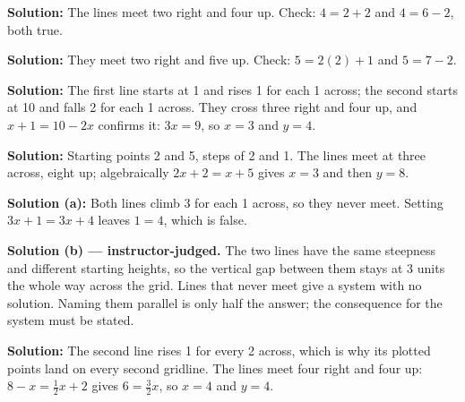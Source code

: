 \documentclass[12pt]{article}
\begin{document}




\textbf{Solution:} The lines meet two right and four up. Check: $4 = 2 + 2$
and $4 = 6 - 2$, both true. 


\textbf{Solution:} They meet two right and five up. Check: $5 = 2(2) + 1$ and
$5 = 7 - 2$. 


\textbf{Solution:} The first line starts at 1 and rises 1 for each 1 across;
the second starts at 10 and falls 2 for each 1 across. They cross three right
and four up, and $x + 1 = 10 - 2x$ confirms it: $3x = 9$, so $x = 3$ and
$y = 4$. 


\textbf{Solution:} Starting points 2 and 5, steps of 2 and 1. The lines meet
at three across, eight up; algebraically $2x + 2 = x + 5$ gives $x = 3$ and
then $y = 8$. 


\textbf{Solution (a):} Both lines climb 3 for each 1 across, so they never
meet. Setting $3x + 1 = 3x + 4$ leaves $1 = 4$, which is false.

\textbf{Solution (b) --- instructor-judged.} The two lines have the same
steepness and different starting heights, so the vertical gap between them
stays at 3 units the whole way across the grid. Lines that never meet give a
system with no solution. Naming them parallel is only half the answer; the
consequence for the system must be stated.


\textbf{Solution:} The second line rises 1 for every 2 across, which is why
its plotted points land on every second gridline. The lines meet four right
and four up: $8 - x = \frac{1}{2}x + 2$ gives $6 = \frac{3}{2}x$, so $x = 4$
and $y = 4$. 

\end{document}
